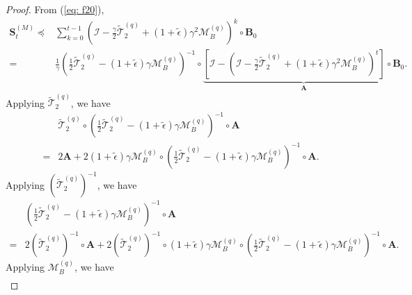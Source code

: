 \documentclass[11pt, letterpaper]{article}
\begin{document}
\begin{proof}
    From (\ref{eq: f20}),
    \begin{equation*}
        \begin{aligned}
            \mathbf{S}_t^{(M)}\preceq& \sum_{k=0}^{t-1}\left(\mathcal{I}-\frac{\gamma}{2}\widetilde{\mathcal{T}}_2^{(q)}+(1+\widetilde{\epsilon})\gamma^2\mathcal{M}_B^{(q)}\right)^k\circ \mathbf{B}_0\\
            =&\frac{1}{\gamma}\left(\frac{1}{2}\widetilde{\mathcal{T}}_2^{(q)}-(1+\widetilde{\epsilon})\gamma\mathcal{M}_B^{(q)}\right)^{-1}\circ\underbrace{\left[\mathcal{I}-\left(\mathcal{I}-\frac{\gamma}{2}\widetilde{\mathcal{T}}_2^{(q)}+(1+\widetilde{\epsilon})\gamma^2\mathcal{M}_B^{(q)}\right)^t\right]\circ \mathbf{B}_0}_{\mathbf{A}}.
        \end{aligned}
    \end{equation*}
    Applying $\widetilde{\mathcal{T}}_2^{(q)}$, we have
    \begin{equation*}
        \begin{aligned}
            &\widetilde{\mathcal{T}}_2^{(q)}\circ\left(\frac{1}{2}\widetilde{\mathcal{T}}_2^{(q)}-(1+\widetilde{\epsilon})\gamma\mathcal{M}_B^{(q)}\right)^{-1}\circ\mathbf{A}\\
            =&2\mathbf{A}+2(1+\widetilde{\epsilon})\gamma\mathcal{M}_B^{(q)}\circ \left(\frac{1}{2}\widetilde{\mathcal{T}}_2^{(q)}-(1+\widetilde{\epsilon})\gamma\mathcal{M}_B^{(q)}\right)^{-1}\circ\mathbf{A}.
        \end{aligned}
    \end{equation*}
    Applying $(\widetilde{\mathcal{T}}_2^{(q)})^{-1}$, we have
    \begin{equation*}
        \begin{aligned}
            &\left(\frac{1}{2}\widetilde{\mathcal{T}}_2^{(q)}-(1+\widetilde{\epsilon})\gamma\mathcal{M}_B^{(q)}\right)^{-1}\circ\mathbf{A}\\
            =&2(\widetilde{\mathcal{T}}_2^{(q)})^{-1}\circ \mathbf{A}+2(\widetilde{\mathcal{T}}_2^{(q)})^{-1}\circ (1+\widetilde{\epsilon})\gamma\mathcal{M}_B^{(q)}\circ \left(\frac{1}{2}\widetilde{\mathcal{T}}_2^{(q)}-(1+\widetilde{\epsilon})\gamma\mathcal{M}_B^{(q)}\right)^{-1}\circ\mathbf{A}.
        \end{aligned}
    \end{equation*}
    Applying $\mathcal{M}_B^{(q)}$, we have
    \begin{equation*}
        \begin{aligned}

\end{aligned}
\end{equation*}
\end{proof}
\end{document}
